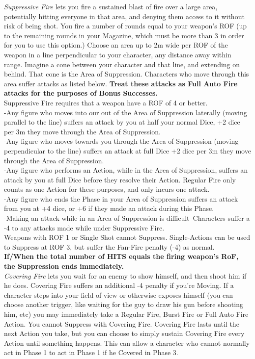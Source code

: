 \documentclass[a4paper, twocolumn, openany]{book}
\begin{document}
{	{\slshape Suppressive Fire} lets you fire a sustained blast of fire over a large area, potentially hitting
	everyone in that area, and denying them access to it without risk of being shot. You fire a
	number of rounds equal to your weapon’s ROF (up to the remaining rounds in your
	Magazine, which must be more than 3 in order for you to use this option.) Choose an
	area up to 2m wide per ROF of the weapon in a line perpendicular to your character, any
	distance away within range. Imagine a cone between your character and that line, and
	extending on behind. That cone is the Area of Suppression. Characters who move
	through this area suffer attacks as listed below. {\bfseries Treat these attacks as Full Auto Fire
		attacks for the purposes of Bonus Successes.}\\
	Suppressive Fire requires that a weapon have a ROF of 4 or better.\\
	-Any figure who moves into our out of the Area of Suppression laterally (moving parallel
	to the line) suffers an attack by you at half your normal Dice, +2 dice per 3m they move
	through the Area of Suppression.\\
	-Any figure who moves towards you through the Area of Suppression (moving
	perpendicular to the line) suffers an attack at full Dice +2 dice per 3m they move through
	the Area of Suppression.\\
	-Any figure who performs an Action, while in the Area of Suppression, suffers an attack
	by you at full Dice before they resolve their Action. Regular Fire only counts as one
	Action for these purposes, and only incurs one attack.\\
	-Any figure who ends the Phase in your Area of Suppression suffers an attack from you
	at +4 dice, or +6 if they made an attack during this Phase.\\
	-Making an attack while in an Area of Suppression is difficult--Characters suffer a -4 to
	any attacks made while under Suppressive Fire.\\
	Weapons with ROF 1 or Single Shot cannot Suppress. Single-Actions can be used to
	Suppress at ROF 3, but suffer the Fan-Fire penalty (-4) as normal.\\
	{\bfseries If/When the total number of HITS equals the firing weapon’s RoF, the Suppression
	ends immediately.}\\

	{\slshape Covering Fire} lets you wait for an enemy to show himself, and then shoot him if he does.
	Covering Fire suffers an additional -4 penalty if you’re Moving. If a character steps into
	your field of view or otherwise exposes himself (you can choose another trigger, like
	waiting for the guy to draw his gun before shooting him, etc) you may immediately take a
	Regular Fire, Burst Fire or Full Auto Fire Action. You cannot Suppress with Covering
	Fire. Covering Fire lasts until the next Action you take, but you can choose to simply
	sustain Covering Fire every Action until something happens. This can allow a character
	who cannot normally act in Phase 1 to act in Phase 1 if he Covered in Phase 3.\\

}
\end{document}
